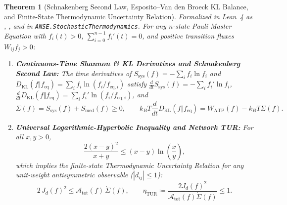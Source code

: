 \documentclass[11pt,a4paper]{article}
\newtheorem{theorem}{Theorem}[section]
\theoremstyle{definition}
\theoremstyle{remark}
\begin{document}
\begin{theorem}[Schnakenberg Second Law, Esposito--Van den Broeck KL Balance, and Finite-State Thermodynamic Uncertainty Relation]
\label{thm:sec2_schnakenberg_tur}
Formalized in Lean~4 as , , and  in \texttt{ANSE.StochasticThermodynamics}. For any $n$-state Pauli Master Equation with $f_i(t) > 0$, $\sum_{i=0}^{n-1} f_i'(t) = 0$, and positive transition fluxes $W_{ij}f_j > 0$:
\begin{enumerate}
  \item \textbf{Continuous-Time Shannon \& KL Derivatives and Schnakenberg Second Law:} The time derivatives of $S_{\mathrm{sys}}(f) = -\sum_i f_i \ln f_i$ and $D_{\mathrm{KL}}(f\Vert f_{\mathrm{eq}}) = \sum_i f_i \ln(f_i/f_{\mathrm{eq},i})$ satisfy $\frac{d}{dt}S_{\mathrm{sys}}(f) = -\sum_i f_i' \ln f_i$, $\frac{d}{dt}D_{\mathrm{KL}}(f\Vert f_{\mathrm{eq}}) = \sum_i f_i' \ln(f_i/f_{\mathrm{eq},i})$, and
  \begin{equation}
    \dot{\Sigma}(f) = \dot{S}_{\mathrm{sys}}(f) + \dot{S}_{\mathrm{med}}(f) \ge 0, \qquad k_B T \frac{d}{dt}D_{\mathrm{KL}}(f\Vert f_{\mathrm{eq}}) = \dot{W}_{\mathrm{ATP}}(f) - k_B T \dot{\Sigma}(f).
  \end{equation}
  \item \textbf{Universal Logarithmic-Hyperbolic Inequality and Network TUR:} For all $x, y > 0$,
  \begin{equation}
    \frac{2(x - y)^2}{x + y} \le (x - y)\ln\!\left(\frac{x}{y}\right),
    \label{eq:sec2_log_mean}
  \end{equation}
  which implies the finite-state Thermodynamic Uncertainty Relation for any unit-weight antisymmetric observable ($|d_{ij}| \le 1$):
  \begin{equation}
    2\,J_d(f)^2 \le \mathcal{A}_{\mathrm{tot}}(f)\,\dot{\Sigma}(f), \qquad \eta_{\mathrm{TUR}} \coloneqq \frac{2 J_d(f)^2}{\mathcal{A}_{\mathrm{tot}}(f)\dot{\Sigma}(f)} \le 1.
  \end{equation}
\end{enumerate}
\end{theorem}
\end{document}
